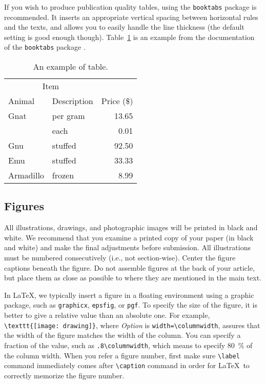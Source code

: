\documentclass[conference]{csce}
\begin{document}
If you wish to produce publication quality tables, using the \texttt{booktabs} package is recommended.
It inserts an appropriate vertical spacing between horizontal rules and the texts, and allows you to easily handle the line thickness (the default setting is good enough though).
Table~\ref{tab:table_example} is an example from the documentation of the \texttt{booktabs} package \cite{booktabs_doc}.

\begin{table}[htb]\centering
\caption{An example of table.}\label{tab:table_example}
\begin{tabular}{@{}llr@{}} \toprule
\multicolumn{2}{c}{Item} \\ \cmidrule(r){1-2}
Animal & Description & Price (\$)\\ \midrule
Gnat & per gram & 13.65 \\
      & each      & 0.01 \\
Gnu   & stuffed   & 92.50 \\
Emu   & stuffed   & 33.33 \\
Armadillo & frozen & 8.99 \\ \bottomrule
\end{tabular}
\end{table} 


\subsection{Figures}\label{sec:figure}
All illustrations, drawings, and photographic images will be printed in black 
and white. We recommend that you examine a printed copy of your paper (in black 
and white) and make the final adjustments before submission. All illustrations 
must be numbered consecutively (i.e., not section-wise). Center the figure captions 
beneath the figure. Do not assemble figures at the back of your article, but 
place them as close as possible to where they are mentioned in the main text. 


In \LaTeX, we typically insert a figure in a floating environment using a graphic package, such as \texttt{graphicx}, \texttt{epsfig}, or \texttt{pgf}.
To specify the size of the figure, it is better to give a relative value than an absolute one.
For example,  \verb|\texttt{[image: drawing]}|, where \textit{Option} is \verb|width=\columnwidth|, assures that the width of the figure matches the width of the column.
You can specify a fraction of the value, such as \verb|.8\columnwidth|, which means to specify 80~\% of the column width.
When you refer a figure number, first make sure \verb|\label| command immediately comes after \verb|\caption| command in order for \LaTeX\ to correctly memorize the figure number. 
\end{document}
